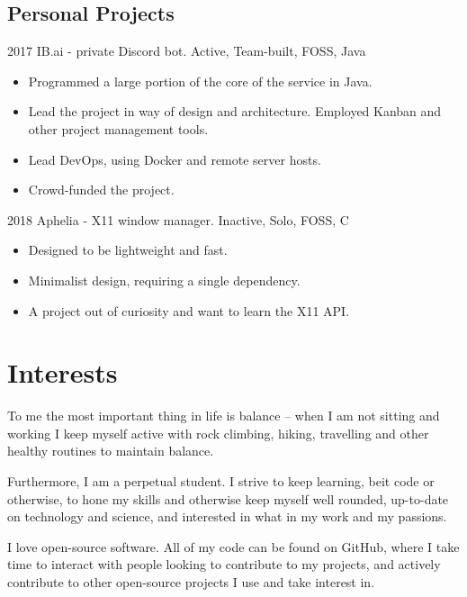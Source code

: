 \documentclass[]{jvcv}
\begin{document}
\newpage

%
\vspace{0.1cm}
\subsection{Personal Projects}
\vspace{0.05cm}

\begin{projectslist}
	\projectentry
		{2017}
		{IB.ai {\normalfont - private Discord bot.}}
		{Active, Team-built, FOSS, Java}
		{\begin{itemize}
			\item Programmed a large portion of the core of the service in Java.
			\item Lead the project in way of design and architecture. Employed Kanban and other project management tools.
			\item Lead DevOps, using Docker and remote server hosts.
			\item Crowd-funded the project.
		\end{itemize}}
	\projectentry
		{2018}
		{Aphelia {\normalfont - X11 window manager.}}
		{Inactive, Solo, FOSS, C}
		{\begin{itemize}
			\item Designed to be lightweight and fast.
			\item Minimalist design, requiring a single dependency.
			\item A project out of curiosity and want to learn the X11 API.
		\end{itemize}}
\end{projectslist}

%
\section{Interests}
To me the most important thing in life is balance -- when I am 
not sitting and working I keep myself active with rock climbing, 
hiking, travelling and other healthy routines to maintain balance.

Furthermore, I am a perpetual student. I strive to keep learning, 
beit code or otherwise, to hone my skills and otherwise keep myself 
well rounded, up-to-date on technology and science, and interested in 
what in my work and my passions.

I love open-source software. All of my code can be found on GitHub, 
where I take time to interact with people looking to contribute to my 
projects, and actively contribute to other open-source projects I use 
and take interest in.
\end{document}
